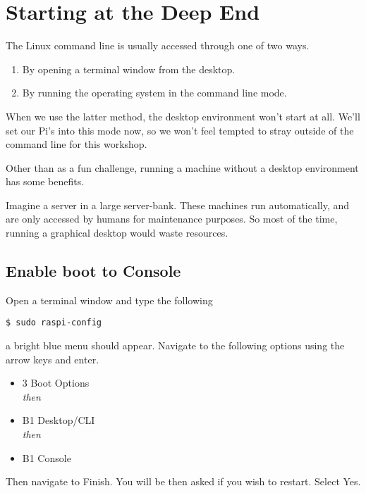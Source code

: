 \section{Starting at the Deep End}

	The Linux command line is usually accessed through one of two ways.
	
	\begin{enumerate}[nosep]
		\item By opening a terminal window from the desktop.
		\item By running the operating system in the command line mode.
	\end{enumerate}
	
	When we use the latter method, the desktop environment won't start at all. We'll set our Pi's into this mode now, so we won't feel tempted to stray outside of the command line for this workshop.
	
	\begin{aside}
		Other than as a fun challenge, running a machine without a desktop environment has some benefits.
		
		Imagine a server in a large server-bank. These machines run automatically, and are only accessed by humans for maintenance purposes. So most of the time, running a graphical desktop would waste resources.
	\end{aside}

	\subsection{Enable boot to Console}
	
		Open a terminal window and type the following
		
\begin{lstlisting}
$ sudo raspi-config
\end{lstlisting}
	
		a bright blue menu should appear. Navigate to the following options using the arrow keys and enter.
		
		\begin{itemize}[nosep]
			\item 3 Boot Options\\\textit{then}
			\item B1 Desktop/CLI\\\textit{then}
			\item B1 Console
		\end{itemize}
	
		Then navigate to Finish. You will be then asked if you wish to restart. Select Yes.
		
